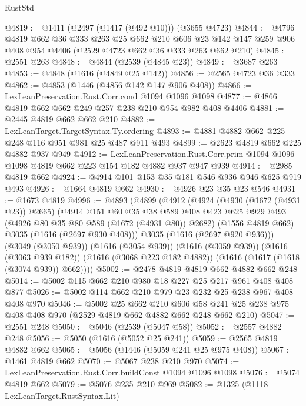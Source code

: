 \begin{lexlean}{RustStd}
\begin{coremodule}
@4819 := @1411 (@2497 (@1417 (@492 @10))) (@3655 @4723)
@4844 := @4796
    @4819
    @662
    @36
    @333
    @263
    @25
    @662
    @210
    @606
    @23
    @142
    @147
    @259
    @906
    @408
    @954
    @4406
    (@2529 @4723 @662 @36 @333 @263 @662 @210)
@4845 := @2551 @263
@4848 := @4844 (@2539 (@4845 @23))
@4849 := @3687 @263
@4853 := @4848 (@1616 (@4849 @25 @142))
@4856 := @2565 @4723 @36 @333
@4862 := @4853 (@1446 (@4856 @142 @147 @906 @408))
@4866 := LexLeanPreservation.Rust.Corr.cond @1094 @1096 @1098
@4877 := @4866 @4819 @662 @662 @249 @257 @238 @210 @954 @982 @408 @4406
@4881 := @2445 @4819 @662 @662 @210
@4882 := LexLeanTarget.TargetSyntax.Ty.ordering
@4893 := @4881 @4882 @662 @225 @248 @116 @951 @981 @25 @487 @911 @493
@4899 := @2623 @4819 @662 @225 @4882 @937 @949
@4912 := LexLeanPreservation.Rust.Corr.prim
    @1094
    @1096
    @1098
    @4819
    @662
    @223
    @154
    @182
    @4882
    @937
    @947
    @939
@4914 := @2985 @4819 @662
@4924 := @4914 @101 @153 @35 @181 @546 @936 @946 @625 @919 @493
@4926 := @1664 @4819 @662
@4930 := @4926 @23 @35 @23 @546
@4931 := @1673 @4819
@4996 := @4893
    (@4899
      (@4912
        (@4924
          (@4930 (@1672 (@4931 @23)) @2665)
          (@4914
            @151
            @60
            @35
            @38
            @589
            @408
            @423
            @625
            @929
            @493
            (@4926 @80 @35 @80 @589 (@1672 (@4931 @80)) @2682)
            (@1556 @4819 @662)
            @3035
            (@1616 (@2697 @930 @408)))
          @3035
          (@1616 (@2697 @920 @936)))
        (@3049 (@3050 @939))
        (@1616 (@3054 @939))
        (@1616 (@3059 @939))
        (@1616 (@3063 @939 @182))
        (@1616 (@3068 @223 @182 @4882))
        (@1616 (@1617 (@1618 (@3074 @939)) @662))))
@5002 := @2478 @4819 @4819 @662 @4882 @662 @248
@5014 := @5002 @115 @662 @210 @980 @18 @227 @25 @217 @961 @408 @408 @877
@5026 := @5002 @114 @662 @210 @979 @23 @232 @25 @238 @967 @408 @408 @970
@5046 := @5002
    @25
    @662
    @210
    @606
    @58
    @241
    @25
    @238
    @975
    @408
    @408
    @970
    (@2529 @4819 @662 @4882 @662 @248 @662 @210)
@5047 := @2551 @248
@5050 := @5046 (@2539 (@5047 @58))
@5052 := @2557 @4882 @248
@5056 := @5050 (@1616 (@5052 @25 @241))
@5059 := @2565 @4819 @4882 @662
@5065 := @5056 (@1446 (@5059 @241 @25 @975 @408))
@5067 := @1461 @4819 @662
@5070 := @5067 @238 @210 @970
@5074 := LexLeanPreservation.Rust.Corr.buildConst @1094 @1096 @1098
@5076 := @5074 @4819 @662
@5079 := @5076 @235 @210 @969
@5082 := @1325 (@1118 LexLeanTarget.RustSyntax.Lit)

\end{coremodule}
\end{lexlean}
